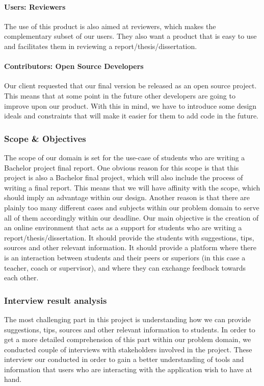 \paragraph{Users: Reviewers} The use of this product is also aimed at reviewers, which makes the complementary subset of our users. They also want a product that is easy to use and facilitates them in reviewing a report/thesis/dissertation.

\paragraph{Contributors: Open Source Developers} Our client requested that our final version be released as an open source project. This means that at some point in the future other developers are going to improve upon our product. With this in mind, we have to introduce some design ideals and constraints that will make it easier for them to add code in the future.

\subsubsection{Scope \& Objectives}

The scope of our domain is set for the use-case of students who are writing a Bachelor project final report. One obvious reason for this scope is that this project is also a Bachelor final project, which will also include the process of writing a final report. This means that we will have affinity with the scope, which should imply an advantage within our design. Another reason is that there are plainly too many different cases and subjects within our problem domain to serve all of them accordingly within our deadline.
Our main objective is the creation of an online environment that acts as a support for students who are writing a report/thesis/dissertation. It should provide the students with suggestions, tips, sources and other relevant information. It should provide a platform where there is an interaction between students and their peers or superiors (in this case a teacher, coach or supervisor), and where they can exchange feedback towards each other.

\subsubsection{Interview result analysis} %

The most challenging part in this project is understanding how we can provide suggestions, tips, sources and other relevant information to students. In order to get a more detailed comprehension of this part within our problem domain, we conducted couple of interviews with stakeholders involved in the project. These interview our conducted in order to gain a better understanding of tools and information that users who are interacting with the application wish to have at hand. 

